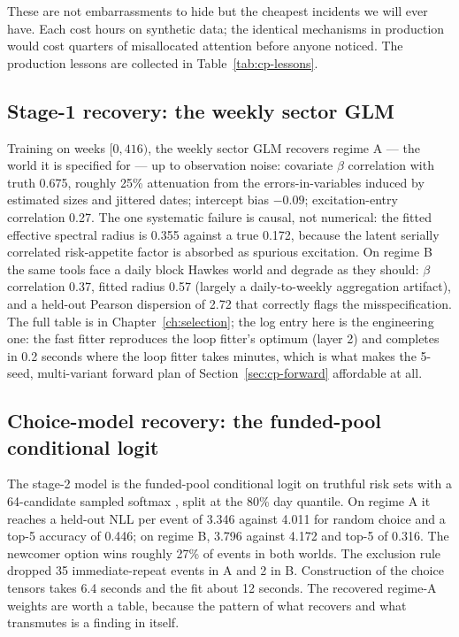 \begin{remark}
\label{rem:cp-generator}
These are not embarrassments to hide but the cheapest incidents we will ever have. Each cost hours on
synthetic data; the identical mechanisms in production would cost quarters of misallocated attention before
anyone noticed. The production lessons are collected in Table~\ref{tab:cp-lessons}.
\end{remark}

\subsection{Stage-1 recovery: the weekly sector GLM}
\label{sec:cp-stage1}

Training on weeks $[0,416)$, the weekly sector GLM recovers regime A --- the world it is specified for ---
up to observation noise: covariate $\beta$ correlation with truth 0.675, roughly 25\% attenuation from the
errors-in-variables induced by estimated sizes and jittered dates; intercept bias $-0.09$; excitation-entry
correlation 0.27. The one systematic failure is causal, not numerical: the fitted effective spectral radius
is 0.355 against a true 0.172, because the latent serially correlated risk-appetite factor is absorbed as
spurious excitation. On regime B the same tools face a daily block Hawkes world and degrade as they should:
$\beta$ correlation 0.37, fitted radius 0.57 (largely a daily-to-weekly aggregation artifact), and a
held-out Pearson dispersion of 2.72 that correctly flags the misspecification. The full table is in
Chapter~\ref{ch:selection}; the log entry here is the engineering one: the fast fitter reproduces the loop
fitter's optimum (layer 2) and completes in 0.2 seconds where the loop fitter takes minutes, which is what
makes the 5-seed, multi-variant forward plan of Section~\ref{sec:cp-forward} affordable at all.

\subsection{Choice-model recovery: the funded-pool conditional logit}
\label{sec:cp-choice}

The stage-2 model is the funded-pool conditional logit on truthful risk sets with a 64-candidate sampled
softmax \cite{mcfadden1974}, split at the 80\% day quantile. On regime A it reaches a held-out NLL per event
of 3.346 against 4.011 for random choice and a top-5 accuracy of 0.446; on regime B, 3.796 against 4.172
and top-5 of 0.316. The newcomer option wins roughly 27\% of events in both worlds. The exclusion rule
dropped 35 immediate-repeat events in A and 2 in B. Construction of the choice tensors takes 6.4 seconds
and the fit about 12 seconds. The recovered regime-A weights are worth a table, because the pattern of what
recovers and what transmutes is a finding in itself.

